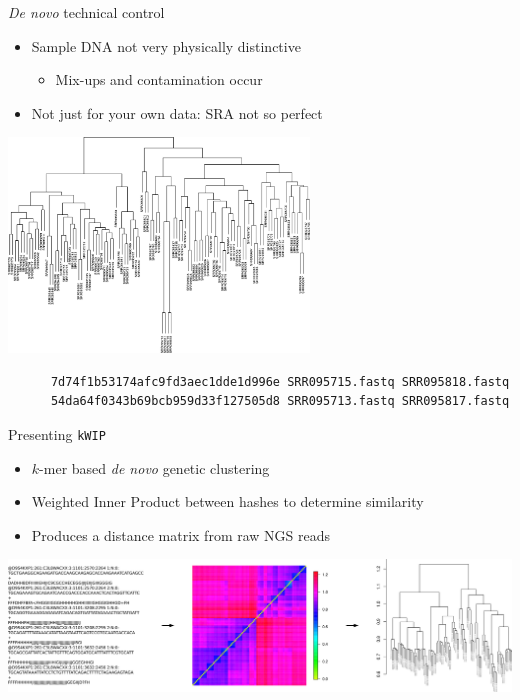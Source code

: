 \documentclass[t]{beamer}
\begin{document}
\begin{frame}[fragile]{\textit{De novo} technical control}
  \begin{itemize}
    \item Sample DNA not very physically distinctive
      \begin{itemize}
        \item Mix-ups and contamination occur
      \end{itemize}
    \item Not just for your own data: SRA not so perfect
  \end{itemize}
  \begin{center}
    \includegraphics[width=0.6\textwidth]{img/at80-tree.png}
  \end{center}
  \pause
  \begingroup
    \fontsize{7pt}{7pt}\selectfont
    \begin{verbatim}
      7d74f1b53174afc9fd3aec1dde1d996e SRR095715.fastq SRR095818.fastq
      54da64f0343b69bcb959d33f127505d8 SRR095713.fastq SRR095817.fastq
    \end{verbatim}
  \endgroup
\end{frame}

\begin{frame}{Presenting \texttt{kWIP}}
  \begin{itemize}
    \item $k$-mer based \textit{de novo} genetic clustering
    \item Weighted Inner Product between hashes to determine similarity
    \item Produces a distance matrix from raw NGS reads
  \end{itemize}
  \begin{center}
    \includegraphics[width=\textwidth]{img/kwip-overview.png}
  \end{center}
\end{frame}
\end{document}
